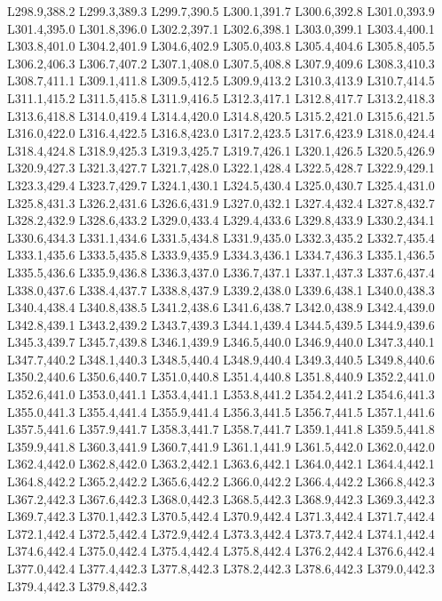 		L298.9,388.2 L299.3,389.3 L299.7,390.5 L300.1,391.7 L300.6,392.8 L301.0,393.9 L301.4,395.0 L301.8,396.0
		L302.2,397.1 L302.6,398.1 L303.0,399.1 L303.4,400.1 L303.8,401.0 L304.2,401.9 L304.6,402.9 L305.0,403.8
		L305.4,404.6 L305.8,405.5 L306.2,406.3 L306.7,407.2 L307.1,408.0 L307.5,408.8 L307.9,409.6 L308.3,410.3
		L308.7,411.1 L309.1,411.8 L309.5,412.5 L309.9,413.2 L310.3,413.9 L310.7,414.5 L311.1,415.2 L311.5,415.8
		L311.9,416.5 L312.3,417.1 L312.8,417.7 L313.2,418.3 L313.6,418.8 L314.0,419.4 L314.4,420.0 L314.8,420.5
		L315.2,421.0 L315.6,421.5 L316.0,422.0 L316.4,422.5 L316.8,423.0 L317.2,423.5 L317.6,423.9 L318.0,424.4
		L318.4,424.8 L318.9,425.3 L319.3,425.7 L319.7,426.1 L320.1,426.5 L320.5,426.9 L320.9,427.3 L321.3,427.7
		L321.7,428.0 L322.1,428.4 L322.5,428.7 L322.9,429.1 L323.3,429.4 L323.7,429.7 L324.1,430.1 L324.5,430.4
		L325.0,430.7 L325.4,431.0 L325.8,431.3 L326.2,431.6 L326.6,431.9 L327.0,432.1 L327.4,432.4 L327.8,432.7
		L328.2,432.9 L328.6,433.2 L329.0,433.4 L329.4,433.6 L329.8,433.9 L330.2,434.1 L330.6,434.3 L331.1,434.6
		L331.5,434.8 L331.9,435.0 L332.3,435.2 L332.7,435.4 L333.1,435.6 L333.5,435.8 L333.9,435.9 L334.3,436.1
		L334.7,436.3 L335.1,436.5 L335.5,436.6 L335.9,436.8 L336.3,437.0 L336.7,437.1 L337.1,437.3 L337.6,437.4
		L338.0,437.6 L338.4,437.7 L338.8,437.9 L339.2,438.0 L339.6,438.1 L340.0,438.3 L340.4,438.4 L340.8,438.5
		L341.2,438.6 L341.6,438.7 L342.0,438.9 L342.4,439.0 L342.8,439.1 L343.2,439.2 L343.7,439.3 L344.1,439.4
		L344.5,439.5 L344.9,439.6 L345.3,439.7 L345.7,439.8 L346.1,439.9 L346.5,440.0 L346.9,440.0 L347.3,440.1
		L347.7,440.2 L348.1,440.3 L348.5,440.4 L348.9,440.4 L349.3,440.5 L349.8,440.6 L350.2,440.6 L350.6,440.7
		L351.0,440.8 L351.4,440.8 L351.8,440.9 L352.2,441.0 L352.6,441.0 L353.0,441.1 L353.4,441.1 L353.8,441.2
		L354.2,441.2 L354.6,441.3 L355.0,441.3 L355.4,441.4 L355.9,441.4 L356.3,441.5 L356.7,441.5 L357.1,441.6
		L357.5,441.6 L357.9,441.7 L358.3,441.7 L358.7,441.7 L359.1,441.8 L359.5,441.8 L359.9,441.8 L360.3,441.9
		L360.7,441.9 L361.1,441.9 L361.5,442.0 L362.0,442.0 L362.4,442.0 L362.8,442.0 L363.2,442.1 L363.6,442.1
		L364.0,442.1 L364.4,442.1 L364.8,442.2 L365.2,442.2 L365.6,442.2 L366.0,442.2 L366.4,442.2 L366.8,442.3
		L367.2,442.3 L367.6,442.3 L368.0,442.3 L368.5,442.3 L368.9,442.3 L369.3,442.3 L369.7,442.3 L370.1,442.3
		L370.5,442.4 L370.9,442.4 L371.3,442.4 L371.7,442.4 L372.1,442.4 L372.5,442.4 L372.9,442.4 L373.3,442.4
		L373.7,442.4 L374.1,442.4 L374.6,442.4 L375.0,442.4 L375.4,442.4 L375.8,442.4 L376.2,442.4 L376.6,442.4
		L377.0,442.4 L377.4,442.3 L377.8,442.3 L378.2,442.3 L378.6,442.3 L379.0,442.3 L379.4,442.3 L379.8,442.3
